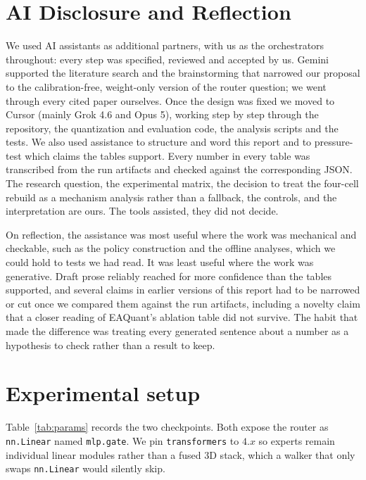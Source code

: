 \documentclass[11pt]{article}
\begin{document}
\section*{AI Disclosure and Reflection}
We used AI assistants as additional
partners, with us as the orchestrators throughout: every step was
specified, reviewed and accepted by us. Gemini supported the literature
search and the brainstorming that narrowed our proposal to the
calibration-free, weight-only version of the router question; we went through every cited paper ourselves. Once the design was fixed we moved to
Cursor (mainly Grok 4.6 and Opus 5), working step by step
through the repository, the quantization and evaluation code, the
analysis scripts and the tests. We also used assistance to structure
and word this report and to pressure-test which claims the tables
support. Every number in every table was transcribed from the run
artifacts and checked against the corresponding JSON. The research
question, the experimental matrix, the decision to treat the four-cell
rebuild as a mechanism analysis rather than a fallback, the controls,
and the interpretation are ours. The tools assisted, they did not
decide.

On reflection, the assistance was most useful where the work was
mechanical and checkable, such as the policy construction and the offline
analyses, which we could hold to tests we had read. It was least useful
where the work was generative. Draft prose reliably reached for more
confidence than the tables supported, and several claims in earlier
versions of this report had to be narrowed or cut once we compared them
against the run artifacts, including a novelty claim that a closer reading
of EAQuant's ablation table did not survive. The habit that made the
difference was treating every generated sentence about a number as a
hypothesis to check rather than a result to keep.



\appendix

\section{Experimental setup}
\label{sec:appendix-setup}

Table~\ref{tab:params} records the two checkpoints. Both expose the router
as \texttt{nn.Linear} named \texttt{mlp.gate}. We pin
\texttt{transformers} to $4.x$ so experts remain individual linear modules
rather than a fused 3D stack, which a walker that only swaps
\texttt{nn.Linear} would silently skip.
\end{document}
